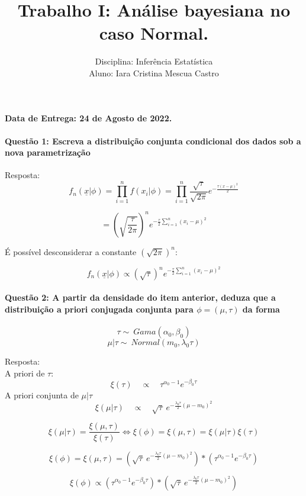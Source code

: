 \documentclass{article}
\title{Trabalho I: Análise bayesiana no caso Normal.}
\author{Disciplina: Inferência Estatística \\ Aluno: Iara Cristina Mescua Castro}
\begin{document}
		\maketitle
		
		\textbf{Data de Entrega: 24 de Agosto de 2022.}
	
	\paragraph{Questão 1: Escreva a distribuição conjunta condicional dos dados sob a nova parametrização}

	Resposta:\\
	$$f_n ( \underline{x} | \phi ) = \prod_{i = 1}^{n} f( x_i | \phi ) =\prod_{i = 1}^{n} \frac{\sqrt{\tau}}{\sqrt{2 \pi }} e^{-\frac{\tau (x-\mu)^2}{2}}$$

	$$= \left(\sqrt{\frac{\tau}{2 \pi}}\right)^n e^{-\frac{\tau}{2} \sum_{i=1}^{n} (x_{i} - \mu)^2}$$
	
	É possível desconsiderar a constante $(\sqrt{{2 \pi}})^n$:
	
	$$f_n ( \underline{x} | \phi ) \propto \left(\sqrt{\tau}\right)^n e^{-\frac{\tau}{2} \sum_{i=1}^{n} (x_{i} - \mu)^2}$$
	
	\paragraph{Questão 2: A partir da densidade do item anterior, deduza que a distribuição a priori conjugada conjunta para $\phi = (\mu, \tau)$ da forma}
	
	$$ \tau \sim\ Gama(\alpha_0, \beta_0)$$
	$$ \mu | \tau \sim\ Normal(m_0, \lambda_0 \tau)$$
	
	Resposta:\\
	
	A priori de $\tau$:
	$$\xi(\tau) \quad \propto \quad \tau^{\alpha_0 - 1} e^{-\beta_0 \tau}$$
	A priori conjunta de $\mu|\tau$
	$$\xi(\mu | \tau) \quad \propto \quad \sqrt{\tau} \: e^{-\frac{\lambda_0 \tau}{2} (\mu - m_0)^2}$$
	
	$$\xi(\mu | \tau) = \frac{\xi(\mu , \tau)}{\xi(\tau)} \Leftrightarrow \xi(\phi) = \xi(\mu , \tau) = \xi(\mu | \tau) {\xi(\tau)}$$
	
	$$\xi(\phi) = \xi(\mu , \tau) = (\sqrt{\tau} \: e^{-\frac{\lambda_0 \tau}{2} (\mu - m_0)^2}) * (\tau^{\alpha_0 - 1} e^{-\beta_0 \tau}) $$
	
	$$\xi(\phi) \propto (\tau^{\alpha_0 - 1} e^{-\beta_0 \tau}) * (\sqrt{ \tau} \: e^{-\frac{\lambda_0 \tau}{2} (\mu - m_0)^2}) $$
	
\end{document}
